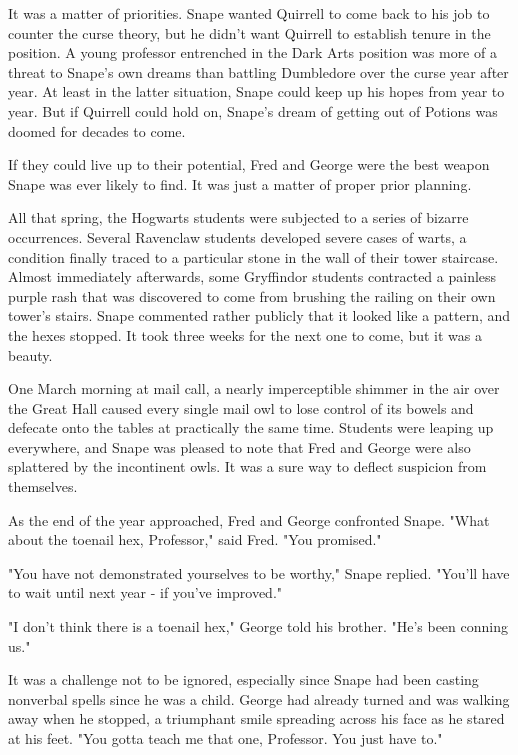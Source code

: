 \documentclass[a4paper,11pt]{article}
\begin{document}
It was a matter of priorities. Snape wanted Quirrell to come back to his job to counter the curse theory, but he didn't want Quirrell to establish tenure in the position. A young professor entrenched in the Dark Arts position was more of a threat to Snape's own dreams than battling Dumbledore over the curse year after year. At least in the latter situation, Snape could keep up his hopes from year to year. But if Quirrell could hold on, Snape's dream of getting out of Potions was doomed for decades to come.

If they could live up to their potential, Fred and George were the best weapon Snape was ever likely to find. It was just a matter of proper prior planning.

All that spring, the Hogwarts students were subjected to a series of bizarre occurrences. Several Ravenclaw students developed severe cases of warts, a condition finally traced to a particular stone in the wall of their tower staircase. Almost immediately afterwards, some Gryffindor students contracted a painless purple rash that was discovered to come from brushing the railing on their own tower's stairs. Snape commented rather publicly that it looked like a pattern, and the hexes stopped. It took three weeks for the next one to come, but it was a beauty.

One March morning at mail call, a nearly imperceptible shimmer in the air over the Great Hall caused every single mail owl to lose control of its bowels and defecate onto the tables at practically the same time. Students were leaping up everywhere, and Snape was pleased to note that Fred and George were also splattered by the incontinent owls. It was a sure way to deflect suspicion from themselves.

As the end of the year approached, Fred and George confronted Snape. "What about the toenail hex, Professor," said Fred. "You promised."

"You have not demonstrated yourselves to be worthy," Snape replied. "You'll have to wait until next year - if you've improved."

"I don't think there is a toenail hex," George told his brother. "He's been conning us."

It was a challenge not to be ignored, especially since Snape had been casting nonverbal spells since he was a child. George had already turned and was walking away when he stopped, a triumphant smile spreading across his face as he stared at his feet. "You gotta teach me that one, Professor. You just have to."
\end{document}
